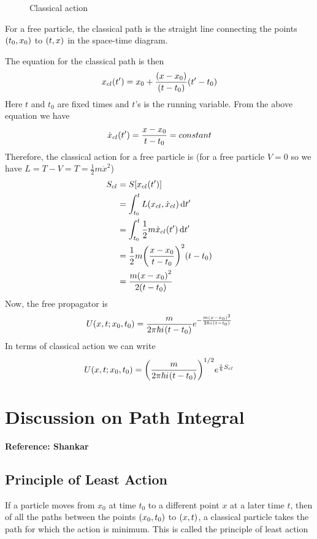 		
		\begin{figure}
			\caption{Classical action}
		\end{figure}
	
		For a free particle, the classical path is the straight line connecting the points $\qty(t_0, x_0)$ to $\qty(t, x)$ in the space-time diagram.
		
		The equation for the classical path is then
		\begin{equation}
			x_{cl}\qty(t^\prime) = x_0 + \frac{\qty(x-x_0)}{\qty(t-t_0)} \qty(t^\prime - t_0)
		\end{equation}
		Here $t$ and $t_0$ are fixed times and $t$'s is the running variable. From the above equation we have
		\begin{equation}
			\dot{x}_{cl}\qty(t^\prime) = \frac{x-x_0}{t-t_0} = constant
		\end{equation}
		Therefore, the classical action for a free particle is (for a free particle $V=0$ so we have $L=T-V=T=\frac{1}{2} m \dot{x}^2$)
		\begin{align}
			S_{cl} 
			&= S\qty[x_{cl}\qty(t^\prime)] \\
			&= \int_{t_0}^{t} L(x_{cl}, \dot{x}_{cl}) \dd{t^\prime} \\
			&= \int_{t_0}^{t} \frac{1}{2} m \dot{x}_{cl}\qty(t^\prime) \dd{t^\prime} \\
			&= \frac{1}{2} m \qty(\frac{x-x_0}{t-t_0})^2 \qty(t-t_0) \\
			&= \frac{m \qty(x-x_0)^2}{2 \qty(t-t_0)}
		\end{align}
		Now, the free propagator is
		\begin{equation}
			U(x,t;x_0, t_0) = \frac{m}{2\pi \hbar {i\mkern1mu} \qty(t-t_0)} e^{-\frac{m\qty(x-x_0)^2}{2\hbar {i\mkern1mu} \qty(t-t_0)}}
		\end{equation}
		In terms of classical action we can write
		\begin{equation}
			U(x,t;x_0,t_0) = \qty(\frac{m}{2\pi \hbar {i\mkern1mu}\qty(t-t_0)})^{1/2} e^{\frac{i}{\hbar} S_{cl}}
		\end{equation}
		
		\section{Discussion on Path Integral}
		\textbf{Reference: Shankar}
		\subsection{Principle of Least Action}
		If a particle moves from $x_0$ at time $t_0$ to a different point $x$ at a later time $t$, then of all the paths between the points $\qty(x_0, t_0)$ to $\qty(x,t)$, a classical particle takes the path for which the action is minimum. This is called the principle of least action
		
